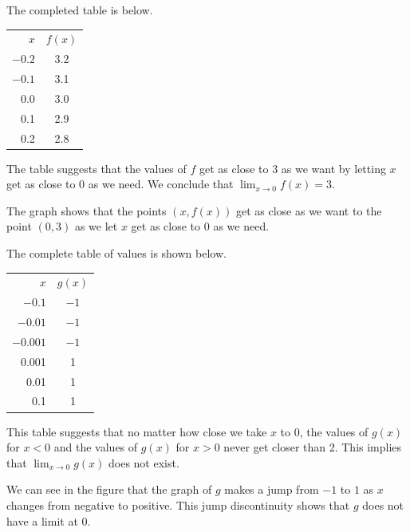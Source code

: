 \begin{activitySolution}
\ba
\item The completed table is below. 
  \begin{center}
    \begin{tabular}{|r|c|}
      \hline      
      $x$ & $f(x)$ \\
      \hhline{|=|=|}
      $-0.2$ & 3.2 \\
      \hline
      $-0.1$ & 3.1 \\
      \hline
      0.0 & 3.0 \\
      \hline
      0.1 & 2.9 \\
      \hline
      0.2 & 2.8 \\
      \hline
    \end{tabular}
  \end{center}
  The table suggests that the values of $f$ get as close to 3 as we want by letting $x$ get as close to 0 as we need. We conclude that 
$\lim_{x\to 0}f(x) = 3$.

\item The graph shows that the points $(x,f(x))$ get as close as we want to the point $(0,3)$ as we let $x$ get as close to 0 as we need. 
      
\item The complete table of values is shown below.
  \begin{center}
    \begin{tabular}{|r|c|}
      \hline      
      $x$ & $g(x)$ \\
      \hhline{|=|=|}
      $-0.1$ & $-1$ \\
      \hline 
      $-0.01$ & $-1$ \\
      \hline
      $-0.001$ & $-1$ \\
      \hline
      0.001 & 1 \\
      \hline
       0.01 & 1 \\
      \hline
      0.1 & 1 \\
      \hline
    \end{tabular}
  \end{center}
  This table suggests that no matter how close we take $x$ to 0, the values of $g(x)$ for $x < 0$ and the values of $g(x)$ for $x > 0$ never get closer than 2. This implies that $\lim_{x\to 0}g(x)$ does not exist. 

\item We can see in the figure that the graph of $g$ makes a jump from $-1$ to $1$ as $x$ changes from negative to positive. This jump discontinuity shows that $g$ does not have a limit at $0$. 
      

\end{activitySolution}

